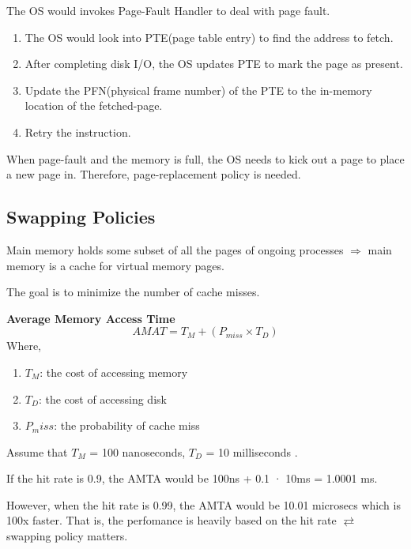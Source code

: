 
    The OS would invokes Page-Fault Handler to deal with page fault.
    
    \begin{enumerate}
        \item The OS would look into PTE(page table entry) to find the address to fetch.
        \item After completing disk I/O, the OS updates PTE to mark the page as present.
        \item Update the PFN(physical frame number) of the PTE to the in-memory location
        of the fetched-page.
        \item Retry the instruction.
    \end{enumerate}


    When page-fault and the memory is full, the OS needs to kick out a page to place
    a new page in. Therefore, page-replacement policy is needed.

\subsection{Swapping Policies}


    Main memory holds some subset of all the pages of ongoing processes  $\Rightarrow$
    main memory is a cache for virtual memory pages.

    The goal is to minimize the number of cache misses.

    \textbf{Average Memory Access Time}
    \begin{equation*}
        AMAT = T_M + (P_{miss}\times T_D)
    \end{equation*}
    Where,
    \begin{enumerate}
        \item $T_M$: the cost of accessing memory
        \item $T_D$: the cost of accessing disk
        \item $P_miss$: the probability of cache miss
    \end{enumerate}

    Assume that $T_M$ = 100 nanoseconds, $T_D$ = 10 milliseconds .
    
    If the hit rate is 0.9, the AMTA would be 100ns + 0.1 · 10ms = 1.0001 ms.

    However, when the hit rate is 0.99, the AMTA would be 10.01 microsecs which is 
    100x faster. That is, the perfomance is heavily based on the hit rate $\rightleftarrows$
    swapping policy matters.

